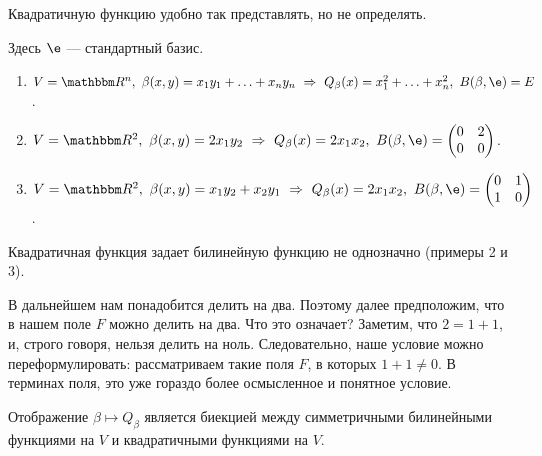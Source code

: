 Квадратичную функцию удобно так представлять, но не определять.

\begin{Examples}
Здесь $\e$ --- стандартный базис.
\begin{enumerate}
\item $V = \R^n,\ \beta(x, y) = x_1y_1 + \ldots + x_ny_n\ \Rightarrow\ Q_\beta(x) = x_1^2 + \ldots + x_n^2,\ B(\beta, \e) = E$.
\item $V = \R^2,\ \beta(x, y) = 2x_1y_2\ \Rightarrow\ Q_\beta(x) = 2x_1x_2,\ B(\beta, \e) = \begin{pmatrix}0 & 2 \\ 0 & 0\end{pmatrix}$.
\item $V=\R^2,\ \beta(x, y) = x_1y_2+x_2y_1\ \Rightarrow\ Q_\beta(x) = 2x_1x_2,\ B(\beta, \e) = \begin{pmatrix}0 & 1 \\ 1 & 0\end{pmatrix}$.
\end{enumerate}
\end{Examples}

\begin{Comment}
Квадратичная функция задает билинейную функцию не однозначно (примеры 2 и 3).
\end{Comment}

В дальнейшем нам понадобится делить на два. Поэтому далее предположим, что в нашем поле $F$ можно делить на два. Что это означает? Заметим, что $2 = 1 + 1$, и, строго говоря, нельзя делить на ноль. Следовательно, наше условие можно переформулировать: рассматриваем такие поля $F$, в которых $1 + 1 \neq 0$. В терминах поля, это уже гораздо более осмысленное и понятное условие.

\begin{Theorem}
Отображение $\beta \mapsto Q_\beta$ является биекцией между симметричными билинейными функциями на $V$ и квадратичными функциями на $V$.
\end{Theorem}

